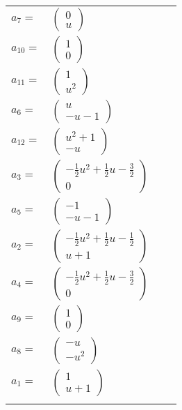 \documentclass[1p]{elsarticle_modified}
\theoremstyle{definition}
\begin{document}
\begin{tabular}{m{7pt} m{180pt} m{7pt} m{180pt} }
\flushright $a_{7}=$&$\begin{pmatrix}0\\u\end{pmatrix}$ \\
\flushright $a_{10}=$&$\begin{pmatrix}1\\0\end{pmatrix}$ \\
\flushright $a_{11}=$&$\begin{pmatrix}1\\u^2\end{pmatrix}$ \\
\flushright $a_{6}=$&$\begin{pmatrix}u\\- u-1\end{pmatrix}$ \\
\flushright $a_{12}=$&$\begin{pmatrix}u^2+1\\- u\end{pmatrix}$ \\
\flushright $a_{3}=$&$\begin{pmatrix}-\frac{1}{2} u^2+\frac{1}{2} u-\frac{3}{2}\\0\end{pmatrix}$ \\
\flushright $a_{5}=$&$\begin{pmatrix}-1\\- u-1\end{pmatrix}$ \\
\flushright $a_{2}=$&$\begin{pmatrix}-\frac{1}{2} u^2+\frac{1}{2} u-\frac{1}{2}\\u+1\end{pmatrix}$ \\
\flushright $a_{4}=$&$\begin{pmatrix}-\frac{1}{2} u^2+\frac{1}{2} u-\frac{3}{2}\\0\end{pmatrix}$ \\
\flushright $a_{9}=$&$\begin{pmatrix}1\\0\end{pmatrix}$ \\
\flushright $a_{8}=$&$\begin{pmatrix}- u\\- u^2\end{pmatrix}$ \\
\flushright $a_{1}=$&$\begin{pmatrix}1\\u+1\end{pmatrix}$\\&\end{tabular}
\end{document}
